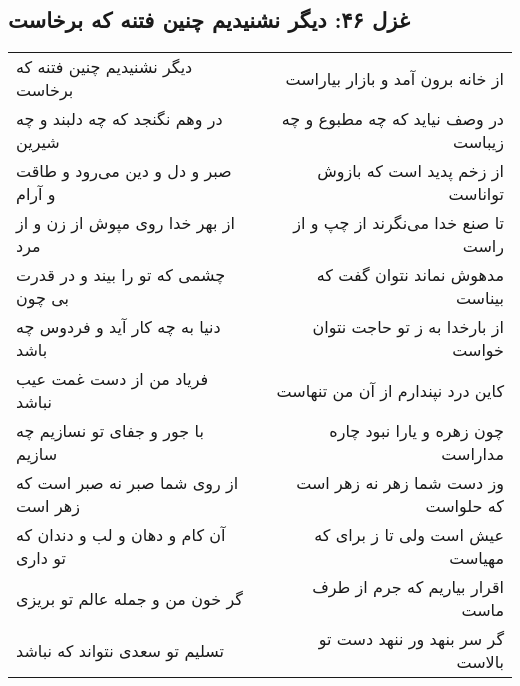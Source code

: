 \begin{center}
\section*{غزل ۴۶: دیگر نشنیدیم چنین فتنه که برخاست}
\label{sec:046}
\begin{longtable}{l p{0.5cm} r}
دیگر نشنیدیم چنین فتنه که برخاست
&&
از خانه برون آمد و بازار بیاراست
\\
در وهم نگنجد که چه دلبند و چه شیرین
&&
در وصف نیاید که چه مطبوع و چه زیباست
\\
صبر و دل و دین می‌رود و طاقت و آرام
&&
از زخم پدید است که بازوش تواناست
\\
از بهر خدا روی مپوش از زن و از مرد
&&
تا صنع خدا می‌نگرند از چپ و از راست
\\
چشمی که تو را بیند و در قدرت بی چون
&&
مدهوش نماند نتوان گفت که بیناست
\\
دنیا به چه کار آید و فردوس چه باشد
&&
از بارخدا به ز تو حاجت نتوان خواست
\\
فریاد من از دست غمت عیب نباشد
&&
کاین درد نپندارم از آن من تنهاست
\\
با جور و جفای تو نسازیم چه سازیم
&&
چون زهره و یارا نبود چاره مداراست
\\
از روی شما صبر نه صبر است که زهر است
&&
وز دست شما زهر نه زهر است که حلواست
\\
آن کام و دهان و لب و دندان که تو داری
&&
عیش است ولی تا ز برای که مهیاست
\\
گر خون من و جمله عالم تو بریزی
&&
اقرار بیاریم که جرم از طرف ماست
\\
تسلیم تو سعدی نتواند که نباشد
&&
گر سر بنهد ور ننهد دست تو بالاست
\\
\end{longtable}
\end{center}
